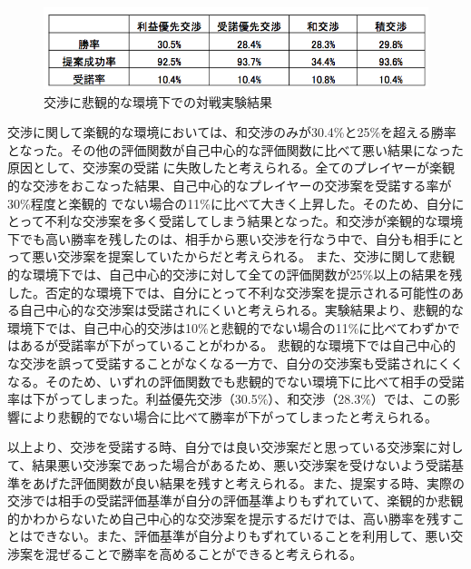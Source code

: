 \documentclass[a4, 10pt,dvipdfmx]{jsarticle}
\begin{document}
\begin{figure}[b]
    \begin{center}
      \includegraphics[width=120mm]{img/nego_negative.png}
    \end{center}
    \caption{交渉に悲観的な環境下での対戦実験結果}
    \label{envirn_negative}
\end{figure}



交渉に関して楽観的な環境においては、和交渉のみが30.4\%と25\%を超える勝率となった。その他の評価関数が自己中心的な評価関数に比べて悪い結果になった原因として、交渉案の受諾
に失敗したと考えられる。全てのプレイヤーが楽観的な交渉をおこなった結果、自己中心的なプレイヤーの交渉案を受諾する率が30\%程度と楽観的
でない場合の11\%に比べて大きく上昇した。そのため、自分にとって不利な交渉案を多く受諾してしまう結果となった。和交渉が楽観的な環境下でも高い勝率を残したのは、相手から悪い交渉を行なう中で、自分も相手にとって悪い交渉案を提案していたからだと考えられる。
また、交渉に関して悲観的な環境下では、自己中心的交渉に対して全ての評価関数が25\%以上の結果を残した。否定的な環境下では、自分にとって不利な交渉案を提示される可能性のある自己中心的な交渉案は受諾されにくいと考えられる。実験結果より、悲観的な環境下では、自己中心的交渉は10\%と悲観的でない場合の11\%に比べてわずかではあるが受諾率が下がっていることがわかる。
悲観的な環境下では自己中心的な交渉を誤って受諾することがなくなる一方で、自分の交渉案も受諾されにくくなる。そのため、いずれの評価関数でも悲観的でない環境下に比べて相手の受諾率は下がってしまった。利益優先交渉（30.5\%）、和交渉（28.3\%）では、この影響により悲観的でない場合に比べて勝率が下がってしまったと考えられる。

以上より、交渉を受諾する時、自分では良い交渉案だと思っている交渉案に対して、結果悪い交渉案であった場合があるため、悪い交渉案を受けないよう受諾基準をあげた評価関数が良い結果を残すと考えられる。また、提案する時、実際の交渉では相手の受諾評価基準が自分の評価基準よりもずれていて、楽観的か悲観的かわからないため自己中心的な交渉案を提示するだけでは、高い勝率を残すことはできない。また、評価基準が自分よりもずれていることを利用して、悪い交渉案を混ぜることで勝率を高めることができると考えられる。
\end{document}
